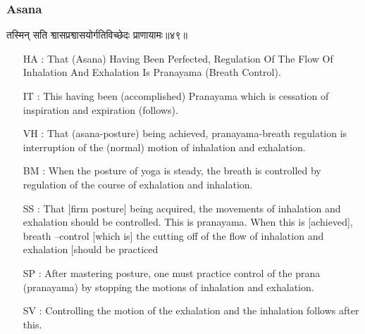 \begin{frame}[fragile]\frametitle{Asana}
\begin{sanskrit}
तस्मिन् सति श्वासप्रश्वासयोर्गतिविच्छेदः प्राणायामः॥४९॥
\end{sanskrit}

	\begin{itemize}
	\item [HA]: That (Asana) Having Been Perfected, Regulation Of The Flow Of Inhalation And Exhalation Is Pranayama (Breath Control).
	\item [IT]: This having been (accomplished) Pranayama which is cessation of inspiration and expiration (follows).
	\item [VH]: That (asana-posture) being achieved, pranayama-breath regulation is interruption of the (normal) motion of inhalation and exhalation.
	\item [BM]: When the posture of yoga is steady, the breath is controlled by regulation of the course of exhalation and inhalation.
	\item [SS]: That [firm posture] being acquired, the movements of inhalation and exhalation should be controlled. This is pranayama. When this is [achieved], breath –control [which is] the cutting off of the flow of inhalation and exhalation [should be practiced
	\item [SP]: After mastering posture, one must practice control of the prana (pranayama) by stopping the motions of inhalation and exhalation.
	\item [SV]: Controlling the motion of the exhalation and the inhalation follows after this. 
	\end{itemize}
\end{frame}



